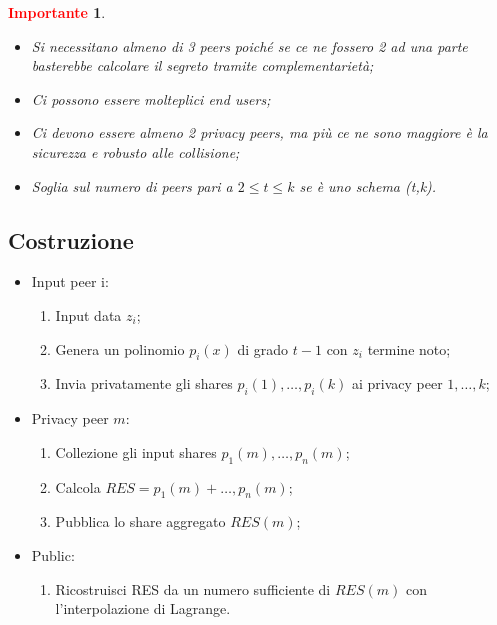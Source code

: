 \documentclass{book}
\newtheorem*{Importante}{\textbf{\textcolor{red}{Importante}}}
\begin{document}
\begin{Importante}
    \begin{itemize}
        \item Si necessitano almeno di 3 peers poiché se ce ne fossero 2 ad una parte basterebbe calcolare il segreto tramite complementarietà;
        \item Ci possono essere molteplici end users;
        \item Ci devono essere almeno 2 privacy peers, ma più ce ne sono maggiore è la sicurezza e robusto alle collisione;
        \item Soglia sul numero di peers pari a \(2\leq t\leq k\) se è uno schema (t,k).
    \end{itemize}
\end{Importante}
\subsection{Costruzione}
\begin{itemize}
    \item Input peer i:\begin{enumerate}
              \item Input data \(z_{i}\);
              \item Genera un polinomio \(p_{i}(x)\) di grado \(t-1\) con \(z_{i}\) termine noto;
              \item Invia privatamente gli shares \(p_{i}(1),\dots,p_{i}(k)\) ai privacy peer \(1,\dots,k\);
          \end{enumerate}
    \item Privacy peer \(m\):\begin{enumerate}
              \item Collezione gli input shares \(p_{1}(m),\dots,p_{n}(m)\);
              \item Calcola \(RES=p_{1}(m)+\dots,p_{n}(m)\);
              \item Pubblica lo share aggregato \(RES(m)\);
          \end{enumerate}
    \item Public:\begin{enumerate}
              \item Ricostruisci RES da un numero sufficiente di \(RES(m)\) con l'interpolazione di Lagrange.
          \end{enumerate}
\end{itemize}
\end{document}
